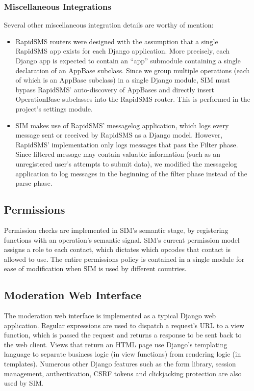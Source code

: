 \documentclass{acm_proc_article-sp}
\begin{document}
\subsubsection{Miscellaneous Integrations}

Several other miscellaneous integration details are worthy of mention:

\begin{itemize}
\item RapidSMS routers were designed with the assumption that a single RapidSMS app exists for each Django application. More precisely, each Django app is expected to contain an ``app'' submodule containing a single declaration of an AppBase subclass. Since we group multiple operations (each of which is an AppBase subclass) in a single Django module, SIM must bypass RapidSMS' auto-discovery of AppBases and directly insert OperationBase subclasses into the RapidSMS router. This is performed in the project's settings module.
\item SIM makes use of RapidSMS' messagelog application, which logs every message sent or received by RapidSMS as a Django model. However, RapidSMS' implementation only logs messages that pass the Filter phase. Since filtered message may contain valuable information (such as an unregistered user's attempts to submit data), we modified the messagelog application to log messages in the beginning of the filter phase instead of the parse phase.
\end{itemize}

\subsection{Permissions}

Permission checks are implemented in SIM's semantic stage, by registering functions with an operation's semantic signal. SIM's current permission model assigns a role to each contact, which dictates which opcodes that contact is allowed to use. The entire permissions policy is contained in a single module for ease of modification when SIM is used by different countries.

\subsection{Moderation Web Interface}

The moderation web interface is implemented as a typical Django web application. Regular expressions are used to dispatch a request's URL to a view function, which is passed the request and returns a response to be sent back to the web client. Views that return an HTML page use Django's templating language to separate business logic (in view functions) from rendering logic (in templates). Numerous other Django features such as the form library, session management, authentication, CSRF tokens and clickjacking protection are also used by SIM.
\end{document}
